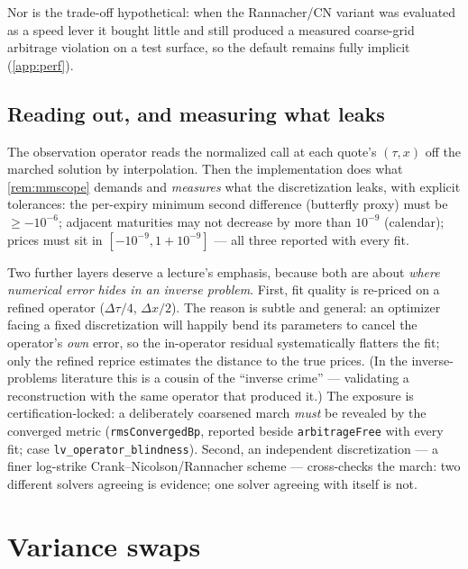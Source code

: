 \documentclass[11pt]{article}
\begin{document}
Nor is the trade-off hypothetical: when the Rannacher/CN variant was
evaluated as a speed lever it bought little and still produced a measured
coarse-grid arbitrage violation on a test surface, so the default remains
fully implicit (\cref{app:perf}).

\subsection{Reading out, and measuring what leaks}
\label{sec:diagnostics}

The observation operator reads the normalized call at each quote's
$(\tau,x)$ off the marched solution by interpolation.  Then the
implementation does what \cref{rem:mmscope} demands and \emph{measures}
what the discretization leaks, with explicit tolerances: the per-expiry
minimum second difference (butterfly proxy) must be $\ge-10^{-6}$;
adjacent maturities may not decrease by more than $10^{-9}$ (calendar);
prices must sit in $[-10^{-9},1+10^{-9}]$ --- all three reported with
every fit.

Two further layers deserve a lecture's emphasis, because both are about
\emph{where numerical error hides in an inverse problem}.  First, fit
quality is re-priced on a refined operator ($\Delta\tau/4$, $\Delta x/2$).
The reason is subtle and general: an optimizer facing a fixed
discretization will happily bend its parameters to cancel the operator's
\emph{own} error, so the in-operator residual systematically flatters the
fit; only the refined reprice estimates the distance to the true prices.
(In the inverse-problems literature this is a cousin of the ``inverse
crime'' --- validating a reconstruction with the same operator that
produced it.)  The exposure is certification-locked: a deliberately
coarsened march \emph{must} be revealed by the converged metric
(\texttt{rmsConvergedBp}, reported beside \texttt{arbitrageFree} with every
fit; case \texttt{lv\_operator\_blindness}).  Second, an independent
discretization --- a finer
log-strike Crank--Nicolson/Rannacher scheme --- cross-checks the march:
two different solvers agreeing is evidence; one solver agreeing with
itself is not.

\section{Variance swaps}
\label{sec:varswap}
\end{document}
